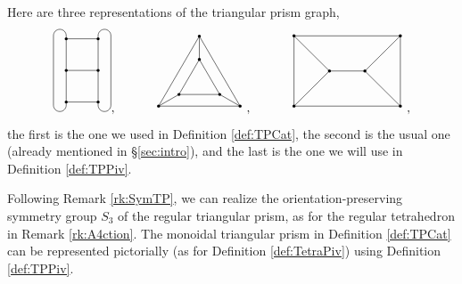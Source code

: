\documentclass{amsart}
\begin{document}
\begin{remark} \label{rk:RepTP}
Here are three representations of the triangular prism graph,
$$
\begin{tikzpicture}[scale=.9]
\draw (1,0) node {\tiny $\bullet$}--(2,0)node {\tiny $\bullet$};
\draw (1,1) node {\tiny $\bullet$}--(2,1)node {\tiny $\bullet$};
\draw (1,2) node {\tiny $\bullet$}--(2,2)node {\tiny $\bullet$};
\draw (1,0) -- (1,2) --++ (0,.1) arc (0:180:.2) --++ (0,-2.2) arc (-180:0:.2) --++ (0,.1);
\draw (2,0) -- (2,2) --++ (0,.1) arc (180:0:.2) --++ (0,-2.2) arc (0:-180:.2) --++ (0,.1);
\end{tikzpicture}
, \hspace{1cm}
\begin{tikzpicture}[scale=1.15]
\draw (0,0) node {\tiny $\bullet$} --(2,0) node {\tiny $\bullet$} --(1,1.732) node {\tiny $\bullet$} --(0,0);
\draw (0,0)--(.5,.2885) node {\tiny $\bullet$} ;
\draw (1,1.732)--(1,1.1545) node {\tiny $\bullet$} ;
\draw (2,0)--(1.5,.2885)--(1,1.1545)--(.5,.2885)--(1.5,.2885) node {\tiny $\bullet$} ;
\end{tikzpicture}
, \hspace{1cm}
\begin{tikzpicture}[scale=1]
\draw (0,2)node {\tiny $\bullet$}--(3,2) node {\tiny $\bullet$};
\draw (1,1) node {\tiny $\bullet$}--(2,1) node {\tiny $\bullet$};
\draw (0,0) node {\tiny $\bullet$}--(3,0) node {\tiny $\bullet$};
\draw (0,0) -- (0,2) -- (1,1) -- (0,0);
\draw (3,0)--(3,2)--(2,1)--(3,0);
\end{tikzpicture},
$$
the first is the one we used in Definition \ref{def:TPCat}, the second is the usual one (already mentioned in \S \ref{sec:intro}), and the last is the one we will use in Definition \ref{def:TPPiv}.
\end{remark}

Following Remark \ref{rk:SymTP}, we can realize the orientation-preserving symmetry group $S_3$ of the regular triangular prism, as for the regular tetrahedron in Remark \ref{rk:A4ction}. The monoidal triangular prism in Definition \ref{def:TPCat} can be represented pictorially (as for Definition \ref{def:TetraPiv}) using Definition \ref{def:TPPiv}.
\end{document}
